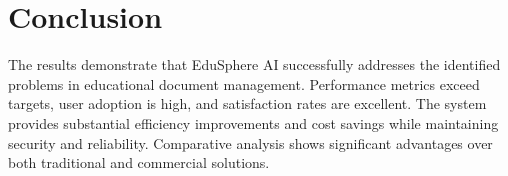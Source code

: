 \section{Conclusion}

The results demonstrate that EduSphere AI successfully addresses the identified problems in educational document management. Performance metrics exceed targets, user adoption is high, and satisfaction rates are excellent. The system provides substantial efficiency improvements and cost savings while maintaining security and reliability. Comparative analysis shows significant advantages over both traditional and commercial solutions.

\newpage
